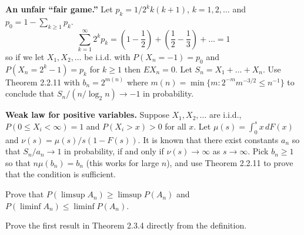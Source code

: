   \begin{exercise}[Durrett 2.2.8]
    \textbf{An unfair ``fair game.''} Let $p_k = 1/2^k k(k + 1)$, $k = 1, 2, \dots$ and $p_0 = 1 - \sum_{k \geq 1} p_k$.
    \begin{equation*}
      \sum_{k=1}^{\infty} 2^k p_k = (1 - \frac{1}{2}) + (\frac{1}{2} - \frac{1}{3}) + \dots = 1
    \end{equation*}
    so if we let $X_1, X_2, \dots$ be i.i.d. with $P(X_n = -1) = p_0$ and $P(X_n = 2^k - 1) = p_k$ for $k \geq 1$ then $EX_n = 0$. Let $S_n = X_1 + \dots + X_n$. Use Theorem 2.2.11 with $b_n = 2^{m(n)}$ where $m(n) = \min\{m : 2^{-m} m^{-3/2} \leq n^{-1}\}$ to conclude that $S_n/(n/ \log_2 n) \to -1$ in probability.
  \end{exercise}
  \begin{solution}

  \end{solution}

  \begin{exercise}[Durrett 2.2.9]
    \textbf{Weak law for positive variables.} Suppose $X_1, X_2, \dots$ are i.i.d., $P(0 \leq X_i < \infty) = 1$ and $P(X_i > x) > 0$ for all $x$. Let $\mu(s) = \int_0^s x \, dF(x)$ and $\nu(s) = \mu(s)/s(1 - F(s))$. It is known that there exist constants $a_n$ so that $S_n/a_n \to 1$ in probability, if and only if $\nu(s) \to \infty$ as $s \to \infty$. Pick $b_n \geq 1$ so that $n\mu(b_n) = b_n$ (this works for large $n$), and use Theorem 2.2.11 to prove that the condition is sufficient.
  \end{exercise}
  \begin{solution}

  \end{solution}

  \begin{exercise}[Durrett 2.3.1]
    Prove that $P(\limsup A_n) \geq \limsup P(A_n)$ and $P(\liminf A_n) \leq \liminf P(A_n)$.
  \end{exercise}
  \begin{solution}

  \end{solution}

  \begin{exercise}[Durrett 2.3.2]
    Prove the first result in Theorem 2.3.4 directly from the definition.
  \end{exercise}
  \begin{solution}

  \end{solution}

